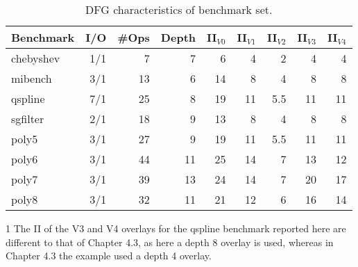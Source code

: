 \begin{table}[!h]
	\renewcommand{\arraystretch}{1.2}
	\caption{DFG characteristics of benchmark set.}
	\label{benchmarks_II}
	\centering
	\begin{threeparttable}
		\begin{tabular}{lrrrrrrrr}
			\toprule
			Benchmark & I/O & \#Ops & Depth & II$_{V0}$ & II$_{V1}$ & II$_{V2}$ & II$_{V3}$\tnote{1} & II$_{V4}$\tnote{1} \\ \midrule
			chebyshev & 1/1 &     7 &     7 &         6 &         4 &         2 &                  4 &                  4 \\
			mibench   & 3/1 &    13 &     6 &        14 &         8 &         4 &                  8 &                  8 \\
			qspline   & 7/1 &    25 &     8 &        19 &        11 &       5.5 &                 11 &                 11 \\
			sgfilter  & 2/1 &    18 &     9 &        13 &         8 &         4 &                  8 &                  8 \\
			poly5     & 3/1 &    27 &     9 &        19 &        11 &       5.5 &                 11 &                 11 \\
			poly6     & 3/1 &    44 &    11 &        25 &        14 &         7 &                 13 &                 12 \\
			poly7     & 3/1 &    39 &    13 &        24 &        14 &         7 &                 20 &                 17 \\
			poly8     & 3/1 &    32 &    11 &        21 &        12 &         6 &                 16 &                 14 \\ \bottomrule
		\end{tabular}
		\begin{tablenotes}
			\item[1] The II of the V3 and V4 overlays for the qspline benchmark reported here are different to that of Chapter 4.3, as here a depth 8 overlay is used, whereas in Chapter 4.3 the example used a depth 4 overlay. 
		\end{tablenotes}
	\end{threeparttable}
\end{table}

